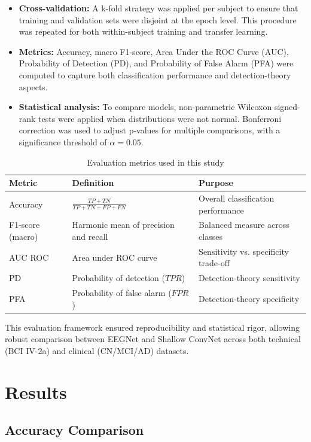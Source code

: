 \documentclass[12pt,a4paper]{article}
\begin{document}
\begin{itemize}
    \item \textbf{Cross-validation:} A k-fold strategy was applied per subject to ensure that training and validation sets were disjoint at the epoch level. This procedure was repeated for both within-subject training and transfer learning.
    \item \textbf{Metrics:} Accuracy, macro F1-score, Area Under the ROC Curve (AUC), Probability of Detection (PD), and Probability of False Alarm (PFA) were computed to capture both classification performance and detection-theory aspects.
    \item \textbf{Statistical analysis:} To compare models, non-parametric Wilcoxon signed-rank tests were applied when distributions were not normal. Bonferroni correction was used to adjust p-values for multiple comparisons, with a significance threshold of $\alpha = 0.05$.
\end{itemize}

\begin{table}[H]
\centering
\caption{Evaluation metrics used in this study}
\label{tab:evaluation_metrics}
\begin{tabular}{@{}lll@{}}
\toprule
\textbf{Metric} & \textbf{Definition} & \textbf{Purpose} \\ \midrule
Accuracy & $\frac{TP+TN}{TP+TN+FP+FN}$ & Overall classification performance \\
F1-score (macro) & Harmonic mean of precision and recall & Balanced measure across classes \\
AUC ROC & Area under ROC curve & Sensitivity vs. specificity trade-off \\
PD & Probability of detection ($TPR$) & Detection-theory sensitivity \\
PFA & Probability of false alarm ($FPR$) & Detection-theory specificity \\ \bottomrule
\end{tabular}
\end{table}

This evaluation framework ensured reproducibility and statistical rigor, allowing robust comparison between EEGNet and Shallow ConvNet across both technical (BCI IV-2a) and clinical (CN/MCI/AD) datasets.


\section{Results}
\subsection{Accuracy Comparison}
\end{document}
